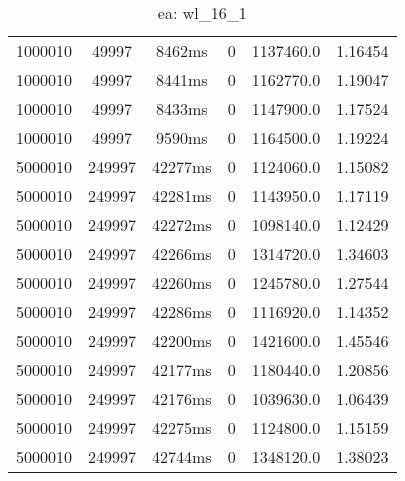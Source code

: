 \documentclass[./main.tex]{subfiles}
\begin{document}
\begin{table}
\begin{tabular}{ c | c | c | c | c | c }
        1000010 & 49997 & 8462ms & 0 & 1137460.0 & 1.16454 \\
        1000010 & 49997 & 8441ms & 0 & 1162770.0 & 1.19047 \\
        1000010 & 49997 & 8433ms & 0 & 1147900.0 & 1.17524 \\
        1000010 & 49997 & 9590ms & 0 & 1164500.0 & 1.19224 \\
        \hline
        5000010 & 249997 & 42277ms & 0 & 1124060.0 & 1.15082 \\
        \rowcolor{lightgray} 5000010 & 249997 & 42281ms & 0 & 1143950.0 & 1.17119 \\
        5000010 & 249997 & 42272ms & 0 & 1098140.0 & 1.12429 \\
        5000010 & 249997 & 42266ms & 0 & 1314720.0 & 1.34603 \\
        5000010 & 249997 & 42260ms & 0 & 1245780.0 & 1.27544 \\
        5000010 & 249997 & 42286ms & 0 & 1116920.0 & 1.14352 \\
        5000010 & 249997 & 42200ms & 0 & 1421600.0 & 1.45546 \\
        5000010 & 249997 & 42177ms & 0 & 1180440.0 & 1.20856 \\
        5000010 & 249997 & 42176ms & 0 & 1039630.0 & 1.06439 \\
        5000010 & 249997 & 42275ms & 0 & 1124800.0 & 1.15159 \\
        5000010 & 249997 & 42744ms & 0 & 1348120.0 & 1.38023 \\
    \end{tabular}
    \caption{ea: wl\_16\_1}
\end{table}
\end{document}
